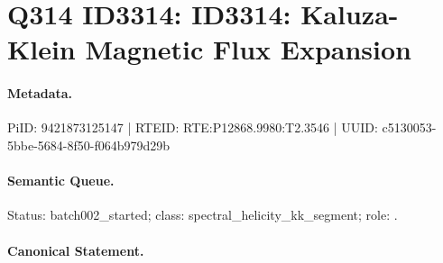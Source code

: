 \section*{Q314 ID3314: ID3314: Kaluza-Klein Magnetic Flux Expansion}
\paragraph{Metadata.}
PiID: 9421873125147 | RTEID: RTE:P12868.9980:T2.3546 | UUID: c5130053-5bbe-5684-8f50-f064b979d29b

\paragraph{Semantic Queue.}
Status: batch002\_started; class: spectral\_helicity\_kk\_segment; role: .

\paragraph{Canonical Statement.}
